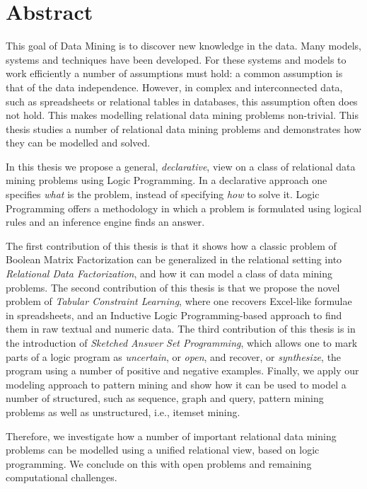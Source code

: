 \chapter{Abstract} \label{ch:abstract}
This goal of Data Mining is to discover new knowledge in the data. Many models, systems and techniques have been developed. For these systems and models to work efficiently a number of assumptions must hold: a common assumption is that of the data independence. However, in complex and interconnected data, such as spreadsheets or relational tables in databases, this assumption often does not hold. This makes modelling relational data mining problems non-trivial. This thesis studies a number of relational data mining problems and demonstrates how they can be modelled and solved.

In this thesis we propose a general, \textit{declarative}, view on a class of relational data mining problems using Logic Programming. In a declarative approach one specifies \textit{what} is the problem, instead of specifying \textit{how} to solve it. Logic Programming offers a methodology in which a problem is formulated using logical rules and an inference engine finds an answer. 

The first contribution of this thesis is that it shows how a classic
problem of Boolean Matrix Factorization can be generalized in the
relational setting into \textit{Relational Data Factorization}, and
how it can model a class of data mining problems. The second contribution of this thesis is that we propose the novel problem of \textit{Tabular Constraint Learning}, where one recovers Excel-like formulae in spreadsheets, and an Inductive Logic Programming-based approach to find them in raw textual and numeric data. The third contribution of this thesis is in the introduction of \textit{Sketched Answer Set Programming}, which allows one to mark parts of a logic program as \textit{uncertain}, or \textit{open}, and recover, or \textit{synthesize}, the program using a number of positive and negative examples. Finally, we apply our modeling approach to pattern mining and show how it can be used to model a number of structured, such as sequence, graph and query, pattern mining problems as well as unstructured, i.e., itemset mining. 

Therefore, we investigate how a number of important relational data mining problems can be modelled using a unified relational view, based on logic programming. We conclude on this with open problems and remaining computational challenges.

\cleardoublepage

